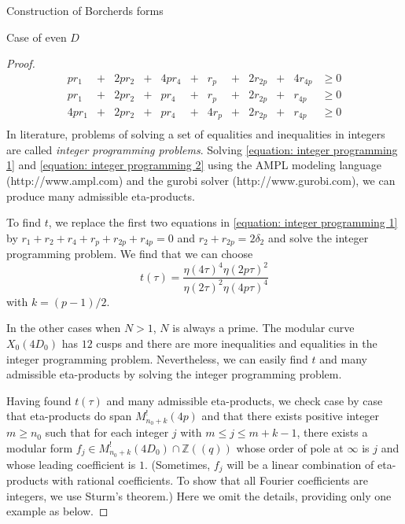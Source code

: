 \documentclass{amsart}
\theoremstyle{definition}
\def\Z{\mathbb Z}
\begin{document}
\begin{section}{Construction of Borcherds forms}
\begin{subsection}{Case of even $D$}
\begin{proof}
\begin{equation}
\begin{array}{rcrcrcrcrcrl}
  pr_1&+&2pr_2&+&4pr_4&+&r_p&+&2r_{2p}&+&4r_{4p}&\ge 0\\
  pr_1&+&2pr_2&+&pr_4&+&r_p&+&2r_{2p}&+&r_{4p}&\ge 0\\
  4pr_1&+&2pr_2&+&pr_4&+&4r_p&+&2r_{2p}&+&r_{4p}&\ge 0\\
  \end{array}
  \end{equation}
  In literature, problems of solving a set of equalities and
  inequalities in integers are called \emph{integer programming
    problems}. Solving \eqref{equation: integer programming 1} and
  \eqref{equation: integer programming 2} using the AMPL modeling
  language (http://www.ampl.com) and the gurobi solver
  (http://www.gurobi.com), we can produce many admissible eta-products.

  To find $t$, we replace the first two equations in \eqref{equation:
    integer programming 1} by $r_1+r_2+r_4+r_p+r_{2p}+r_{4p}=0$ and
  $r_2+r_{2p}=2\delta_2$ and solve the integer programming problem. We
  find that we can choose
  $$
    t(\tau)=\frac{\eta(4\tau)^4\eta(2p\tau)^2}{\eta(2\tau)^2\eta(4p\tau)^4}
  $$
  with $k=(p-1)/2$.

  In the other cases when $N>1$, $N$ is always a prime. The modular
  curve $X_0(4D_0)$ has $12$ cusps and there are more inequalities and
  equalities in the integer programming problem. Nevertheless, we can
  easily find $t$ and many admissible eta-products by solving the
  integer programming problem.

  Having found $t(\tau)$ and many admissible
  eta-products, we check case by case that eta-products do span
  $M^!_{n_0+k}(4p)$ and that there exists positive integer $m\ge n_0$
  such that for each integer $j$ with $m\le j\le m+k-1$,
  there exists a modular form $f_j\in M^!_{n_0+k}(4D_0)\cap\Z((q))$
  whose order of pole at $\infty$ is $j$ and whose leading coefficient
  is $1$. (Sometimes, $f_j$ will be a linear combination of
  eta-products with rational coefficients. To show that all Fourier
  coefficients are integers, we use Sturm's theorem.) Here we
  omit the details, providing only one example as below.
\end{proof}


\end{subsection}
\end{section}
\end{document}
